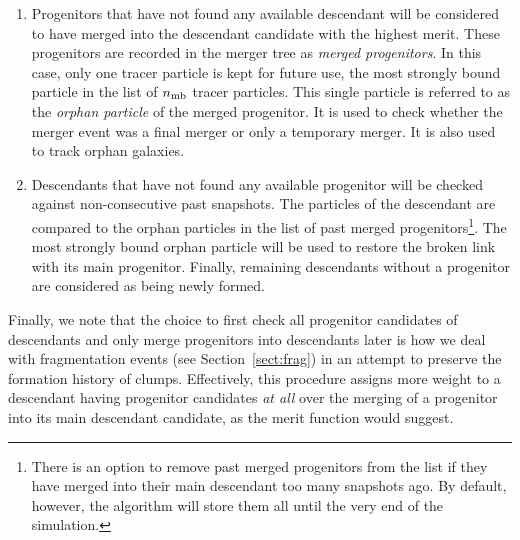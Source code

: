 \begin{enumerate}

\item Progenitors that have not found any available descendant will be
  considered to have merged into the descendant candidate with the highest merit. These progenitors are recorded in the merger tree as
  {\it merged progenitors}.  In this case, only one tracer particle is
  kept for future use, the most strongly bound particle in the list of $n_{\rm
    mb}$ tracer particles.  This single particle is referred to as the
  \emph{orphan particle} of the merged progenitor.  It is used to
  check whether the merger event was a final merger or only a
  temporary merger. It is also used to track orphan galaxies.

\item Descendants that have not found any available progenitor will be
  checked against non-consecutive past snapshots. The particles of the
  descendant are compared to the orphan particles in the list of past
  merged progenitors\footnote{There is an option to remove past merged
  progenitors from the list if they have merged into their main
  descendant too many snapshots ago.  By default, however, the
  algorithm will store them all until the very end of the
  simulation.}.  The most strongly bound orphan particle will be used
  to restore the broken link with its main progenitor.  Finally,
  remaining descendants without a progenitor are considered as being
  newly formed.

\end{enumerate}

Finally, we note that the choice to first check all progenitor candidates of descendants and only
merge progenitors into descendants later is how we deal with fragmentation
events (see Section~\ref{sect:frag}) in an attempt to preserve the formation
history of clumps. Effectively, this procedure assigns more weight to a
descendant having progenitor candidates \textit{at all} over the merging of a progenitor into its main descendant candidate, as the merit function would suggest.

